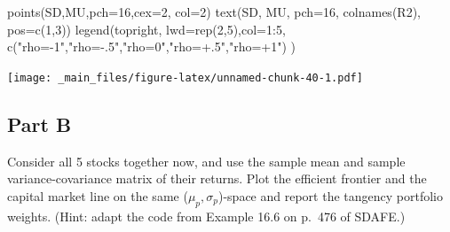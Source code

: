 \documentclass[
  oneside]{book}
\newenvironment{Shaded}{\begin{snugshade}}{\end{snugshade}}
\newcommand{\AttributeTok}[1]{\textcolor[rgb]{0.77,0.63,0.00}{#1}}
\newcommand{\DecValTok}[1]{\textcolor[rgb]{0.00,0.00,0.81}{#1}}
\newcommand{\FunctionTok}[1]{\textcolor[rgb]{0.00,0.00,0.00}{#1}}
\newcommand{\NormalTok}[1]{#1}
\newcommand{\SpecialCharTok}[1]{\textcolor[rgb]{0.00,0.00,0.00}{#1}}
\newcommand{\StringTok}[1]{\textcolor[rgb]{0.31,0.60,0.02}{#1}}
\begin{document}
\begin{Shaded}
\begin{Highlighting}[]
\FunctionTok{points}\NormalTok{(SD,MU,}\AttributeTok{pch=}\DecValTok{16}\NormalTok{,}\AttributeTok{cex=}\DecValTok{2}\NormalTok{, }\AttributeTok{col=}\DecValTok{2}\NormalTok{)}
\FunctionTok{text}\NormalTok{(SD, MU, }\AttributeTok{pch=}\DecValTok{16}\NormalTok{, }\FunctionTok{colnames}\NormalTok{(R2), }\AttributeTok{pos=}\FunctionTok{c}\NormalTok{(}\DecValTok{1}\NormalTok{,}\DecValTok{3}\NormalTok{))}
\FunctionTok{legend}\NormalTok{(}\StringTok{\textquotesingle{}topright\textquotesingle{}}\NormalTok{, }\AttributeTok{lwd=}\FunctionTok{rep}\NormalTok{(}\DecValTok{2}\NormalTok{,}\DecValTok{5}\NormalTok{),}\AttributeTok{col=}\DecValTok{1}\SpecialCharTok{:}\DecValTok{5}\NormalTok{, }
       \FunctionTok{c}\NormalTok{(}\StringTok{"rho={-}1"}\NormalTok{,}\StringTok{"rho={-}.5"}\NormalTok{,}\StringTok{"rho=0"}\NormalTok{,}\StringTok{"rho=+.5"}\NormalTok{,}\StringTok{"rho=+1"}\NormalTok{)  )}
\end{Highlighting}
\end{Shaded}

\texttt{[image: \_main\_files/figure-latex/unnamed-chunk-40-1.pdf]}

\hypertarget{part-b-7}{%
\subsection{Part B}\label{part-b-7}}

Consider all 5 stocks together now, and use the sample mean and sample variance-covariance matrix of their returns. Plot the efficient frontier and the capital market line on the same (\(\mu_p,\sigma_p\))-space and report the tangency portfolio weights.
(Hint: adapt the code from Example 16.6 on p.~476 of SDAFE.)
\end{document}
